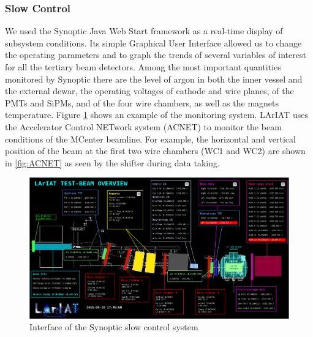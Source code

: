 \subsubsection{Slow Control}
We used the Synoptic Java Web Start framework as a real-time display of subsystem conditions. Its simple 
Graphical User Interface allowed us to change the operating parameters and to graph the trends of several variables of interest for all the tertiary beam detectors.  Among the most important quantities monitored by Synoptic there are the level of argon in both the inner vessel and the external dewar, the operating voltages of cathode and wire planes, of the PMTs and SiPMs, and of the four wire chambers, as well as the magnets temperature. Figure \ref{fig:synoptics} shows an example of the monitoring system.
LArIAT uses the Accelerator Control NETwork system (ACNET) to monitor the beam conditions of the MCenter beamline. For example, the horizontal and vertical position of the beam at the first two wire chambers (WC1 and WC2) are shown in \ref{fig:ACNET} as seen by the shifter during data taking. 

\begin{figure}[htb]
\centering
\includegraphics[width=\textwidth,height=\textheight,keepaspectratio]{Chapter-3/Images/BeamOverview.png}
\caption{Interface of the Synoptic slow control system}
\label{fig:synoptics}
\end{figure}

